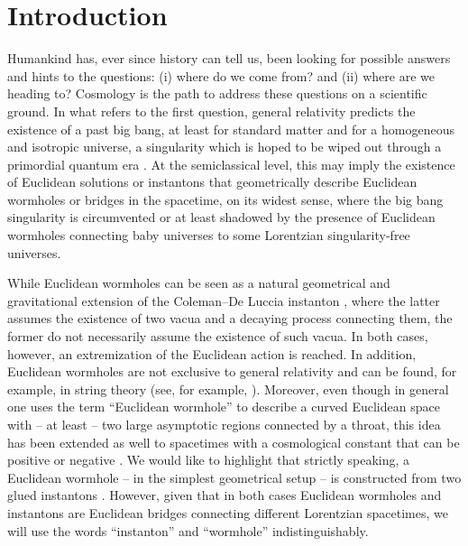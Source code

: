 \documentclass[aps,nofootinbib,prd,superscriptaddress,eqsecnum,showpacs,showkeys,preprintnumbers,altaffilletter]{revtex4}
\begin{document}
\section{Introduction}

Humankind has, ever since history can tell us, been looking for possible answers and hints to the questions: (i) where do we come from? and (ii) where are we heading to? Cosmology is the path to address these questions on a scientific ground. In what refers to the first question, general relativity predicts the existence of a past big bang, at least for standard matter and for a homogeneous and isotropic universe, a singularity which is hoped to be wiped out  through a primordial quantum era \cite{clausbook}. At the semiclassical level, this may imply the existence of Euclidean solutions or instantons that geometrically describe Euclidean wormholes or bridges in the spacetime, on its widest sense, where the big bang singularity is circumvented or at least shadowed by the presence of Euclidean wormholes \cite{Hawking:1987mz,Giddings:1987cg,Halliwell:1989ky,Barcelo:1995gz,mariam2002,RP2014} connecting baby universes to some Lorentzian singularity-free universes. 

While Euclidean wormholes can be seen as a natural geometrical and gravitational extension of the Coleman--De Luccia instanton \cite{Coleman:1980aw}, where the latter assumes the existence of two vacua and a decaying process connecting them, the former do not necessarily assume the existence of such vacua. In both cases, however, an extremization of the Euclidean action is reached. In addition, Euclidean wormholes are not exclusive to general relativity and can be found, for example, in string theory (see, for example, \cite{ArkaniHamed:2007js,Hertog:2017owm}). Moreover, even though in general one uses the term ``Euclidean wormhole'' to describe a curved Euclidean space with -- at least -- two large asymptotic regions connected by a throat, this idea has been extended as well to spacetimes with a cosmological constant that can be positive \cite{mariam2002,chen16} or negative \cite{Barcelo:1995gz,barcelo97,barcelo98}. We would like to highlight that strictly speaking, a Euclidean wormhole -- in the simplest geometrical setup -- is constructed from two glued instantons \cite{barvinsky06,barvinsky07}. However, given that in both cases Euclidean wormholes and instantons are Euclidean bridges connecting different Lorentzian spacetimes, we will use the words ``instanton'' and ``wormhole'' indistinguishably.
\end{document}
